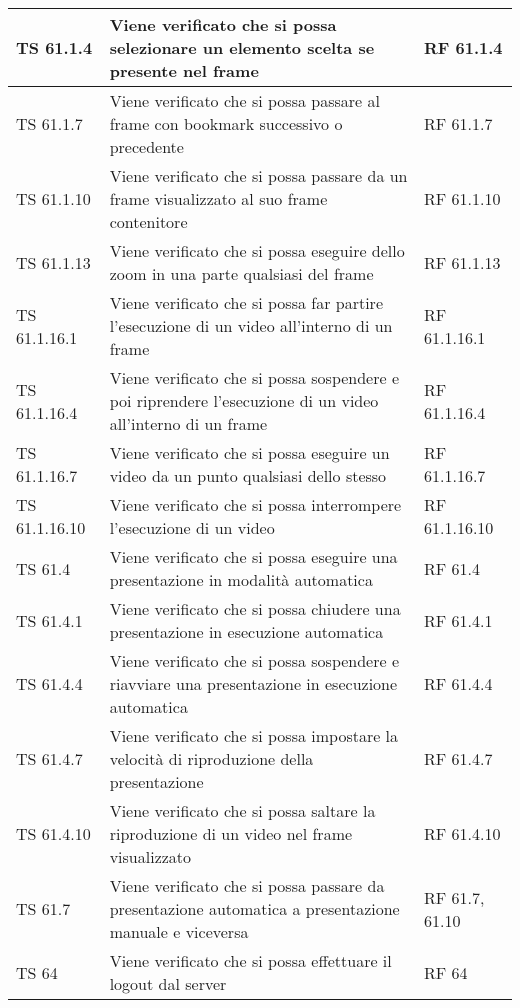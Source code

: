 {{\begin{longtable} [c]{| p{3cm} | p{6cm} |p{3cm}|}
			\hline
			TS 61.1.4 & Viene verificato che si possa selezionare un elemento scelta\ped{g} se presente nel frame\ped{g} & RF 61.1.4\\
			\hline
			TS 61.1.7 & Viene verificato che si possa passare al frame\ped{g} con bookmark\ped{g} successivo o precedente & RF 61.1.7\\
			\hline
			TS 61.1.10 & Viene verificato che si possa passare da un frame\ped{g} visualizzato al suo frame\ped{g} contenitore & RF 61.1.10\\
			\hline
			TS 61.1.13 & Viene verificato che si possa eseguire dello zoom in una parte qualsiasi del frame\ped{g} & RF 61.1.13\\
			\hline
			TS 61.1.16.1 & Viene verificato che si possa far partire l'esecuzione di un video all'interno di un frame\ped{g} & RF 61.1.16.1\\
			\hline
			TS 61.1.16.4 & Viene verificato che si possa sospendere\ped{g} e poi riprendere l'esecuzione di un video all'interno di un frame\ped{g} & RF 61.1.16.4\\
			\hline
			TS 61.1.16.7 & Viene verificato che si possa eseguire un video da un punto qualsiasi dello stesso & RF 61.1.16.7\\
			\hline
			TS 61.1.16.10 & Viene verificato che si possa interrompere l'esecuzione di un video & RF 61.1.16.10\\
			\hline
			TS 61.4 & Viene verificato che si possa eseguire una presentazione in modalità automatica & RF 61.4\\
			\hline
			TS 61.4.1 & Viene verificato che si possa chiudere una presentazione in esecuzione automatica & RF 61.4.1\\
			\hline
			TS 61.4.4 & Viene verificato che si possa sospendere\ped{g} e riavviare una presentazione in esecuzione automatica & RF 61.4.4\\
			\hline
			TS 61.4.7 & Viene verificato che si possa impostare la velocità di riproduzione della presentazione & RF 61.4.7\\
			\hline
			TS 61.4.10 & Viene verificato che si possa saltare la riproduzione di un video nel frame\ped{g} visualizzato & RF 61.4.10\\
			\hline
			TS 61.7 & Viene verificato che si possa passare da presentazione automatica a presentazione manuale e viceversa & RF 61.7, 61.10\\
			\hline
			TS 64 & Viene verificato che si possa effettuare il logout\ped{g} dal server\ped{g} & RF 64\\
			\hline

\end{longtable}}}
